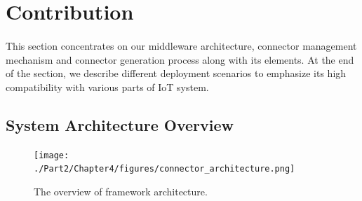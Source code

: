 \section{Contribution}
\paragraph{} This section concentrates on our middleware architecture, connector management mechanism and connector generation process along with its elements. At the end of the section, we describe different deployment scenarios to emphasize its high compatibility with various parts of IoT system.
\subsection{System Architecture Overview}

\begin{figure}[h!] 
 \begin{center} 
 \texttt{[image: ./Part2/Chapter4/figures/connector\_architecture.png]} 
    \caption{The overview of framework architecture.}
     \label{fig:c4_overview_architecture}
  \end{center} 
\end{figure}


